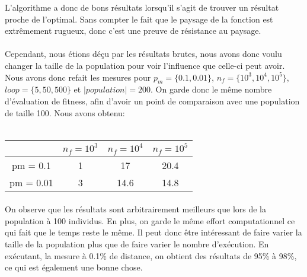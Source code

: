 \documentclass[a4paper, 11pt]{article}
\begin{document}
L'algorithme a donc de bons résultats lorsqu'il s'agit de trouver un résultat proche de l'optimal. Sans compter le fait que le paysage
de la fonction est extrêmement rugueux, donc c'est une preuve de résistance au paysage.

\paragraph{}
Cependant, nous étions déçu par les résultats brutes, nous avons donc voulu changer la taille de la population pour voir l'influence que
celle-ci peut avoir.
Nous avons donc refait les mesures pour $p_m = \{0.1,0.01\}$, $n_f = \{10^3,10^4,10^5\}$, $loop = \{5,50,500\}$ 
et $|population| = 200$. On garde donc le même nombre d'évaluation de fitness, afin d'avoir un point de comparaison avec une population 
de taille 100.
Nous avons obtenu:\\
\\
\begin{tabular}{|c|c|c|c|}
 \hline
  & $n_f = 10^3$ & $n_f = 10^4$ & $n_f = 10^5$\\
  \hline
  pm = 0.1 & 1 & 17 & 20.4\\
  \hline
  pm = 0.01 & 3 & 14.6 & 14.8 \\
  \hline
\end{tabular}
\paragraph{}
On observe que les résultats sont arbitrairement meilleurs que lors de la population à 100 individus. En plus, on garde le même effort 
computationnel ce qui fait que le temps reste le même. Il peut donc être intéressant de faire varier la taille de la population plus que 
de faire varier le nombre d'exécution.
En exécutant, la mesure à 0.1\% de distance, on obtient des résultats de 95\% à 98\%, ce qui est également une bonne chose.
\end{document}
